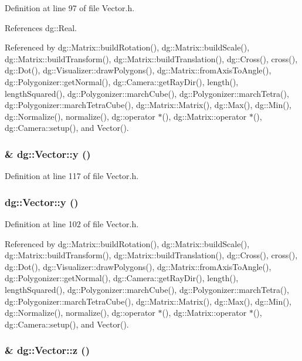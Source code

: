 Definition at line 97 of file Vector.h.

References dg::Real.

Referenced by dg::Matrix::build\-Rotation(), dg::Matrix::build\-Scale(), dg::Matrix::build\-Transform(), dg::Matrix::build\-Translation(), dg::Cross(), cross(), dg::Dot(), dg::Visualizer::draw\-Polygons(), dg::Matrix::from\-Axis\-To\-Angle(), dg::Polygonizer::get\-Normal(), dg::Camera::get\-Ray\-Dir(), length(), length\-Squared(), dg::Polygonizer::march\-Cube(), dg::Polygonizer::march\-Tetra(), dg::Polygonizer::march\-Tetra\-Cube(), dg::Matrix::Matrix(), dg::Max(), dg::Min(), dg::Normalize(), normalize(), dg::operator $\ast$(), dg::Matrix::operator $\ast$(), dg::Camera::setup(), and Vector().
\subsubsection{ \& dg::Vector::y ()\hspace{0.3cm}{\tt  [inline]}}\label{classdg_1_1Vector_a6}




Definition at line 117 of file Vector.h.
\subsubsection{ dg::Vector::y ()\hspace{0.3cm}{\tt  [inline]}}\label{classdg_1_1Vector_a3}




Definition at line 102 of file Vector.h.

Referenced by dg::Matrix::build\-Rotation(), dg::Matrix::build\-Scale(), dg::Matrix::build\-Transform(), dg::Matrix::build\-Translation(), dg::Cross(), cross(), dg::Dot(), dg::Visualizer::draw\-Polygons(), dg::Matrix::from\-Axis\-To\-Angle(), dg::Polygonizer::get\-Normal(), dg::Camera::get\-Ray\-Dir(), length(), length\-Squared(), dg::Polygonizer::march\-Cube(), dg::Polygonizer::march\-Tetra(), dg::Polygonizer::march\-Tetra\-Cube(), dg::Matrix::Matrix(), dg::Max(), dg::Min(), dg::Normalize(), normalize(), dg::operator $\ast$(), dg::Matrix::operator $\ast$(), dg::Camera::setup(), and Vector().
\subsubsection{ \& dg::Vector::z ()\hspace{0.3cm}{\tt  [inline]}}\label{classdg_1_1Vector_a7}




